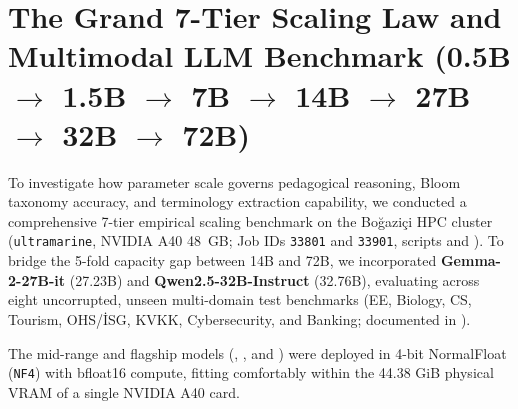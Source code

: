\documentclass[a4paper,12pt]{report}
\begin{document}
\section{The Grand 7-Tier Scaling Law and Multimodal LLM Benchmark (0.5B \texorpdfstring{$\to$}{->} 1.5B \texorpdfstring{$\to$}{->} 7B \texorpdfstring{$\to$}{->} 14B \texorpdfstring{$\to$}{->} 27B \texorpdfstring{$\to$}{->} 32B \texorpdfstring{$\to$}{->} 72B)}
\label{sec:scaling_law_72b}

To investigate how parameter scale governs pedagogical reasoning, Bloom taxonomy accuracy, and terminology extraction capability, we conducted a comprehensive 7-tier empirical scaling benchmark on the Bo\u{g}azi\c{c}i HPC cluster (\texttt{ultramarine}, NVIDIA A40 48~GB; Job IDs \texttt{33801} and \texttt{33901}, scripts  and ). To bridge the 5-fold capacity gap between 14B and 72B, we incorporated \textbf{Gemma-2-27B-it} (27.23B) and \textbf{Qwen2.5-32B-Instruct} (32.76B), evaluating across eight uncorrupted, unseen multi-domain test benchmarks (EE, Biology, CS, Tourism, OHS/İSG, KVKK, Cybersecurity, and Banking; documented in ).

The mid-range and flagship models (, , and ) were deployed in 4-bit NormalFloat (\texttt{NF4}) with bfloat16 compute, fitting comfortably within the 44.38 GiB physical VRAM of a single NVIDIA A40 card.
\end{document}
